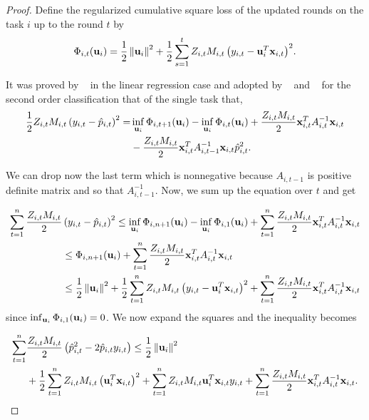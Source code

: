 \begin{proof}
Define the regularized cumulative square loss of the updated rounds on the task 
$i$ up to the round $t$ by
\begin{equation*}
\Phi_{i,t}(\mathbf{u}_i)=\frac{1}{2}\left\Vert {\mathbf{u}_i} \right\Vert^2+\frac{1}{2}\sum_{s=1}^{t}{Z_{i,t}M_{i,t}\left({y_{i,t}-\mathbf{u}_i^T\mathbf{x}_{i,t}}\right)}^2.
\end{equation*}

\noindent
It was proved by ~\cite{Forster} in the linear regression case and adopted by
~\cite{cesa2006worst} and ~\cite{crammer2014doubly} for the second order classification that of 
the single task that,
\begin{equation*}
\begin{split}
\frac{1}{2} Z_{i,t}M_{i,t}\left({y_{i,t}-\hat{p}_{i,t}}\right)^{2}= &\inf_{\mathbf{u}_i}{\Phi_{i,t+1}}(\mathbf{u}_i)-\inf_{\mathbf{u}_i}{\Phi_{i,t}}(\mathbf{u}_i)
+\frac{Z_{i,t}M_{i,t}}{2}\mathbf{x}_{i,t}^TA_{i,t}^{-1}\mathbf{x}_{i,t}\\
&-\frac{Z_{i,t}M_{i,t}}{2}\mathbf{x}_{i,t}^TA_{i,t-1}^{-1}\mathbf{x}_{i,t}\hat{p}_{i,t}^2.
\end{split}
\end{equation*} 

\noindent
We can drop now the last term which is nonnegative because $A_{i,t-1}$ is 
positive definite matrix and so that $A_{i,t-1}^{-1}$.
Now, we sum up the equation over $t$ and get

\begin{equation*}
 \begin{split}
\sum_{t=1}^{n}\frac{Z_{i,t}M_{i,t}}{2}&\left({y_{i,t}-\hat{p}_{i,t}}\right)^{2} \le \inf_{\mathbf{u}_i}{\Phi_{i,n+1}}(\mathbf{u}_i)
-\inf_{\mathbf{u}_i}{\Phi_{i,1}}(\mathbf{u}_i)+\sum_{t=1}^{n}\frac{Z_{i,t}M_{i,t}}{2}\mathbf{x}_{i,t}^TA_{i,t}^{-1}\mathbf{x}_{i,t}\\
&\le  \Phi_{i,n+1}(\mathbf{u}_i)+\sum_{t=1}^{n}\frac{Z_{i,t}M_{i,t}}{2}\mathbf{x}_{i,t}^TA_{i,t}^{-1}\mathbf{x}_{i,t}\\
&\le  \frac{1}{2}\left\Vert {\mathbf{u}_i} \right\Vert^2+\frac{1}{2}\sum_{t=1}^{n}{Z_{i,t}M_{i,t}\left({y_{i,t}-\mathbf{u}_i^T\mathbf{x}_{i,t}}\right)}^2+
\sum_{t=1}^{n}\frac{Z_{i,t}M_{i,t}}{2}\mathbf{x}_{i,t}^TA_{i,t}^{-1}\mathbf{x}_{i,t}\\
\end{split}
\end{equation*} 
since $\inf_{\mathbf{u}_i}{\Phi_{i,1}}(\mathbf{u}_i)=0$. We now expand the squares and the 
inequality becomes

\begin{equation} \label{eq:so_first_step}
 \begin{split}
   \sum_{t=1}^{n}&\frac{Z_{i,t}M_{i,t}}{2}\left({\hat{p}_{i,t}^2-2\hat{p}_{i,t}y_{i,t}}\right)
   \le  \frac{1}{2}\left\Vert {\mathbf{u}_i} \right\Vert^2 \\
   &+\frac{1}{2}\sum_{t=1}^{n}{Z_{i,t}M_{i,t}\left({\mathbf{u}_i^T\mathbf{x}_{i,t}}\right)}^2 
   +\sum_{t=1}^{n}{Z_{i,t}M_{i,t}\mathbf{u}_i^T\mathbf{x}_{i,t}y_{i,t}}
+\sum_{t=1}^{n}\frac{Z_{i,t}M_{i,t}}{2}\mathbf{x}_{i,t}^TA_{i,t}^{-1}\mathbf{x}_{i,t}.\\
\end{split}
\end{equation} 


\end{proof}
